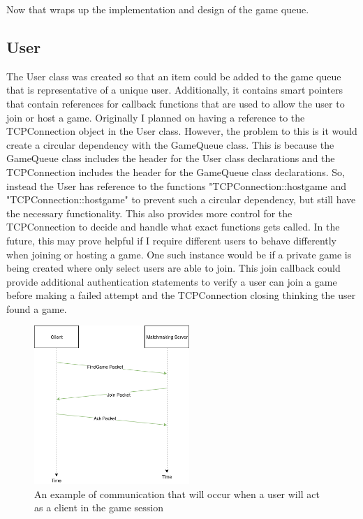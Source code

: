 \documentclass[conference]{IEEEtran}
\begin{document}
Now that wraps up the implementation and design of the game queue.

\subsection{User}
The User class was created so that an item could be added to the game queue that is representative of a unique user.
Additionally, it contains smart pointers that contain references for callback functions that are used to allow the user to join or host a game.
Originally I planned on having a reference to the TCPConnection object in the User class.
However, the problem to this is it would create a circular dependency with the GameQueue class.
This is because the GameQueue class includes the header for the User class declarations and the TCPConnection includes the header for the GameQueue class declarations.
So, instead the User has reference to the functions "TCPConnection::host\textunderscore game and "TCPConnection::host\textunderscore game" to prevent such a circular dependency, but still have the necessary functionality.
This also provides more control for the TCPConnection to decide and handle what exact functions gets called.
In the future, this may prove helpful if I require different users to behave differently when joining or hosting a game.
One such instance would be if a private game is being created where only select users are able to join.
This join callback could provide additional authentication statements to verify a user can join a game before making a failed attempt and the TCPConnection closing thinking the user found a game.

\begin{figure}[h]
\centerline{\includegraphics[width=\linewidth, height=6cm]{figures/ClientCommunication.png}}
\caption{An example of communication that will occur when a user will act as a client in the game session }
\label{fig}
\end{figure}
\end{document}
